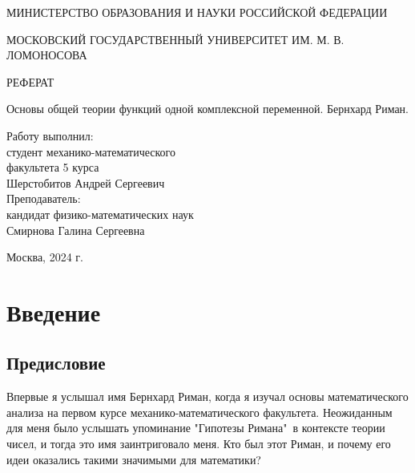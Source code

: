\documentclass[a4paper,12pt]{article}
\theoremstyle{remark}
\begin{document}
\begin{center}
  {\small МИНИСТЕРСТВО ОБРАЗОВАНИЯ И НАУКИ РОССИЙСКОЙ ФЕДЕРАЦИИ}

  \vspace{0.1cm}

  {\small МОСКОВСКИЙ ГОСУДАРСТВЕННЫЙ УНИВЕРСИТЕТ ИМ. М. В. ЛОМОНОСОВА}
  \vspace{4.5cm}


  {\Huge\textsc{РЕФЕРАТ}\\[5mm]}

  {\Large  Основы общей теории функций одной комплексной
    переменной. Бернхард Риман.}
  \bigskip

  \vspace{0.25cm}
\end{center}

\vfill

\hfill\begin{minipage}{0.55\linewidth}
  Работу выполнил: \\
  студент механико-математического \\
  факультета 5 курса\\
  Шерстобитов Андрей Сергеевич\\
  Преподаватель:\\
  кандидат физико-математических наук \\
  Смирнова Галина Сергеевна\\
\end{minipage}

\vfill

\begin{center}
  Москва, 2024 г.
\end{center}

\thispagestyle{empty}
\newpage

\tableofcontents

\thispagestyle{empty}
\newpage

\section{Введение}

\subsection{Предисловие}

Впервые я услышал имя Бернхард Риман, когда я изучал основы
математического анализа на первом курсе механико-математического
факультета. Неожиданным для меня было услышать упоминание
"Гипотезы Римана"\ в контексте теории чисел,
и тогда это имя заинтриговало меня. Кто был этот Риман,
и почему его идеи оказались такими значимыми для математики?
\end{document}
